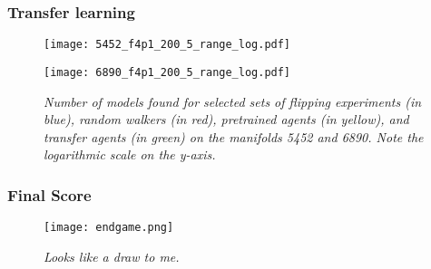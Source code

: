 \documentclass{beamer}
\begin{document}
\begin{frame}
\frametitle{Transfer learning}
\begin{figure}[t]
	
	\centering
	\begin{minipage}{0.47\linewidth}
		\texttt{[image: 5452\_f4p1\_200\_5\_range\_log.pdf]}
	\end{minipage}
	\begin{minipage}{0.47\linewidth}
		\texttt{[image: 6890\_f4p1\_200\_5\_range\_log.pdf]}
	\end{minipage}
	
	\caption{\it Number of models found for selected sets of flipping experiments (in blue), random walkers (in red), pretrained agents (in yellow), and transfer agents (in green) on the manifolds 5452 and 6890. Note the logarithmic scale on the y-axis.}
	\label{fig: transfer}
\end{figure}
\end{frame}

\begin{frame}
\frametitle{Final Score}
\begin{figure}
	\centering
	\texttt{[image: endgame.png]}
	\caption{\it Looks like a draw to me.}
\end{figure}
\end{frame}
\end{document}
